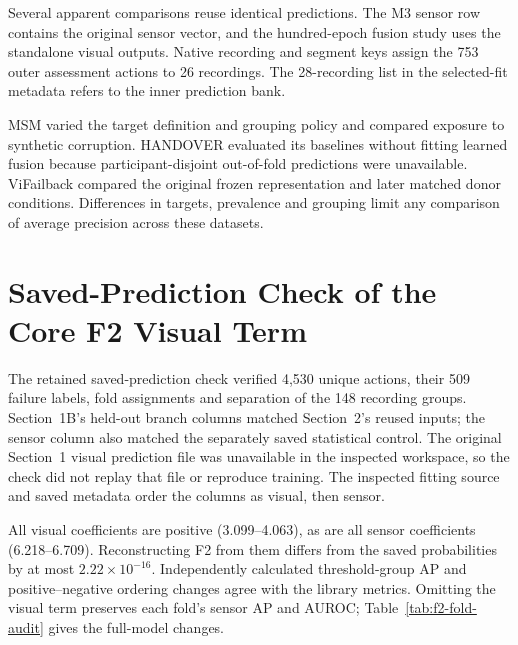 Several apparent comparisons reuse identical predictions. The M3 sensor row contains the
original sensor vector, and the hundred-epoch fusion study uses the standalone visual
outputs. Native recording and segment keys assign the 753 outer assessment actions to 26
recordings. The 28-recording list in the selected-fit metadata refers to the inner
prediction bank.

MSM varied the target definition and grouping policy and compared exposure to synthetic
corruption. HANDOVER evaluated its baselines without fitting learned fusion because
participant-disjoint out-of-fold predictions were unavailable. ViFailback compared the
original frozen representation and later matched donor conditions. Differences in
targets, prevalence and grouping limit any comparison of average precision across these
datasets.

\section{Saved-Prediction Check of the Core F2 Visual Term}
The retained saved-prediction check verified 4,530 unique actions, their 509 failure
labels, fold assignments and separation of the 148 recording groups. Section~1B's
held-out branch columns matched Section~2's reused inputs; the sensor column also
matched the separately saved statistical control. The original Section~1 visual
prediction file was unavailable in the inspected workspace, so the check did not replay
that file or reproduce training. The inspected fitting source and saved metadata order
the columns as visual, then sensor.

All visual coefficients are positive (3.099--4.063), as are all sensor coefficients
(6.218--6.709). Reconstructing F2 from them differs from the saved probabilities by at
most $2.22\times10^{-16}$. Independently calculated threshold-group AP and
positive--negative ordering changes agree with the library metrics. Omitting the visual
term preserves each fold's sensor AP and AUROC; Table~\ref{tab:f2-fold-audit} gives the
full-model changes.

